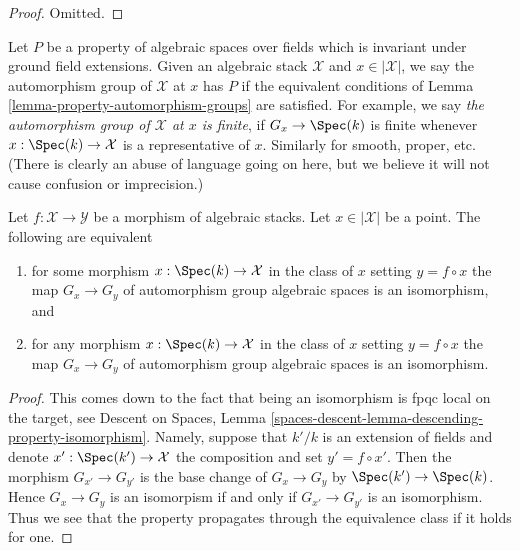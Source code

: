 \begin{proof}
Omitted.
\end{proof}

\begin{remark}
\label{remark-property-automorphism-groups}
Let $P$ be a property of algebraic spaces over fields which is invariant
under ground field extensions. Given an algebraic stack $\mathcal{X}$
and $x \in |\mathcal{X}|$, we say the automorphism group of $\mathcal{X}$
at $x$ has $P$ if the equivalent conditions of
Lemma \ref{lemma-property-automorphism-groups} are satisfied.
For example, we say {\it the automorphism group of $\mathcal{X}$
at $x$ is finite}, if $G_x \to \Spec(k)$ is finite whenever
$x : \Spec(k) \to \mathcal{X}$ is a representative of $x$.
Similarly for smooth, proper, etc.
(There is clearly an abuse of language going on here, but we
believe it will not cause confusion or imprecision.)
\end{remark}

\begin{lemma}
\label{lemma-iso-automorphism-groups}
Let $f : \mathcal{X} \to \mathcal{Y}$ be a morphism of algebraic stacks.
Let $x \in |\mathcal{X}|$ be a point. The following are equivalent
\begin{enumerate}
\item for some morphism $x : \Spec(k) \to \mathcal{X}$ in the
class of $x$ setting $y = f \circ x$ the map
$G_x \to G_y$ of automorphism group algebraic spaces
is an isomorphism, and
\item for any morphism $x : \Spec(k) \to \mathcal{X}$ in the
class of $x$ setting $y = f \circ x$ the map
$G_x \to G_y$ of automorphism group algebraic spaces
is an isomorphism.
\end{enumerate}
\end{lemma}

\begin{proof}
This comes down to the fact that being an isomorphism
is fpqc local on the target, see
Descent on Spaces, Lemma
\ref{spaces-descent-lemma-descending-property-isomorphism}.
Namely, suppose that $k'/k$ is an extension of fields and
denote $x' : \Spec(k') \to \mathcal{X}$ the composition
and set $y' = f \circ x'$.
Then the morphism $G_{x'} \to G_{y'}$ is the base change
of $G_x \to G_y$ by $\Spec(k') \to \Spec(k)$.
Hence $G_x \to G_y$ is an isomorpism
if and only if $G_{x'} \to G_{y'}$ is an isomorphism.
Thus we see that the property propagates through the
equivalence class if it holds for one.
\end{proof}

